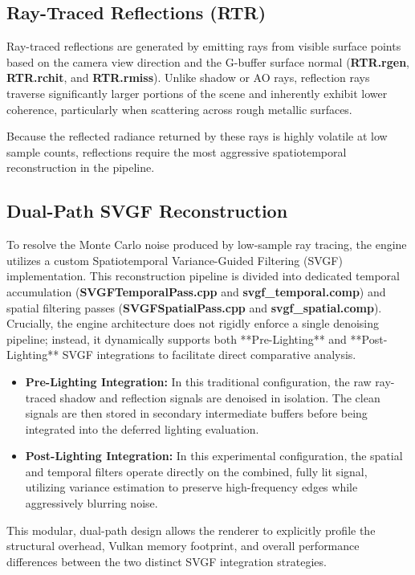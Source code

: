 \documentclass[12pt,a4paper]{report}
\begin{document}
\subsection{ Ray-Traced Reflections (RTR)}
Ray-traced reflections are generated by emitting rays from visible surface points based on the camera view direction and the G-buffer surface normal (\textbf{RTR.rgen}, \textbf{RTR.rchit}, and \textbf{RTR.rmiss}).
Unlike shadow or AO rays, reflection rays traverse significantly larger portions of the scene and inherently exhibit lower coherence, particularly when scattering across rough metallic surfaces.

Because the reflected radiance returned by these rays is highly volatile at low sample counts, reflections require the most aggressive spatiotemporal reconstruction in the pipeline.

\subsection{Dual-Path SVGF Reconstruction}
To resolve the Monte Carlo noise produced by low-sample ray tracing, the engine utilizes a custom Spatiotemporal Variance-Guided Filtering (SVGF) implementation.
This reconstruction pipeline is divided into dedicated temporal accumulation (\textbf{SVGFTemporalPass.cpp} and \textbf{svgf\_temporal.comp}) and spatial filtering passes (\textbf{SVGFSpatialPass.cpp} and \textbf{svgf\_spatial.comp}).
Crucially, the engine architecture does not rigidly enforce a single denoising pipeline; instead, it dynamically supports both **Pre-Lighting** and **Post-Lighting** SVGF integrations to facilitate direct comparative analysis.

\begin{itemize}
    \item \textbf{Pre-Lighting Integration:} In this traditional configuration, the raw ray-traced shadow and reflection signals are denoised in isolation. The clean signals are then stored in secondary intermediate buffers before being integrated into the deferred lighting evaluation.
    \item \textbf{Post-Lighting Integration:} In this experimental configuration, the spatial and temporal filters operate directly on the combined, fully lit signal, utilizing variance estimation to preserve high-frequency edges while aggressively blurring noise.
\end{itemize}
This modular, dual-path design allows the renderer to explicitly profile the structural overhead, Vulkan memory footprint, and overall performance differences between the two distinct SVGF integration strategies.
\end{document}
